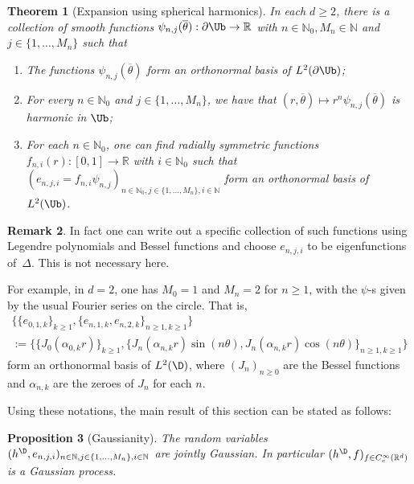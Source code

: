 \documentclass[JEP,XML,SOM,Unicode,published]{cedram}
\newtheorem{theorem}{Theorem}
\newtheorem{prop}[theorem]{Proposition}
\theoremstyle{definition}
\newtheorem{rmk}[theorem]{Remark}
\newcommand{\R}{\mathbb{R}}
\newcommand{\N}{\mathbb{N}}
\let\ol\overline
\begin{document}
\begin{theorem}[Expansion using spherical harmonics]\label{thm:sph}
In each $d \geq 2$, there is a collection of smooth functions $\psi_{n,j}(\ol{\theta}): \partial \Ub \to \R$ with $n \in \N_0, M_n \in \N$ and $j \in \{1, \dots, M_n\} $ such that
\begin{enumerate}
\item The functions $\psi_{n,j}(\ol{\theta})$ form an orthonormal basis of $L^2(\partial \Ub)$;
\item For every $n \in \N_0$ and $j \in \{1, \dots, M_n\} $, we have that $(r,\ol{\theta})\mapsto r^n\psi_{n,j}(\ol{\theta})$ is harmonic in $\Ub$;
\item For each $n \in \N_0$, one can find radially symmetric functions $f_{n,i}(r):[0,1] \to \R$ with $i \in \N_0$ such that $(e_{n,j,i} = f_{n,i}\psi_{n,j})_{n \in \N_0, j \in \{1, \dots, M_n\},i \in \N}$ form an orthonormal basis of $L^2(\Ub)$.
\end{enumerate}
\end{theorem}

\begin{rmk}
In fact one can write out a specific collection of such functions using Legendre polynomials and Bessel functions and choose $e_{n,j,i}$ to be eigenfunctions of~$\Delta$. This is not necessary here.

For example, in $d = 2$, one has $M_0=1$ and $M_n = 2$ for $n\ge 1$, with the $\psi$-s given by the usual Fourier series on the circle. That is,
\begin{multline*}
\bigl\{\{e_{0,1,k}\}_{k\ge 1},\{e_{n,1,k},e_{n,2,k}\}_{n\ge 1,k\ge 1} \bigr\}\\
:= \bigl\{\{J_0(\alpha_{0,k}r)\}_{k\ge 1}, \{J_n(\alpha_{n,k}r) \sin(n\theta), J_n(\alpha_{n,k}r) \cos(n\theta)\}_{n\ge 1, k\ge 1} \bigr\}
\end{multline*}
form an orthonormal basis of $L^2(\D)$, where $(J_n)_{n\ge 0}$ are the Bessel functions and $\alpha_{n,k}$ are the zeroes of $J_n$ for each $n$.
\end{rmk}
Using these notations, the main result of this section can be stated as follows:

\begin{prop}[Gaussianity]\label{prop:gauss}
The random variables $(h^\D,e_{n,j,i})_{n \in \N, j \in \{1, \dots, M_n\},i \in \N}$ are jointly Gaussian. In particular $(h^\D, f)_{f \in C_c^\infty(\R^d)}$ is a Gaussian process.
\end{prop}
\end{document}
